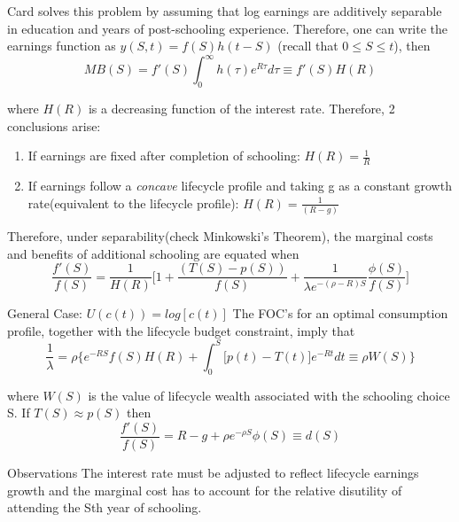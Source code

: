 \documentclass{beamer}
\begin{document}
\begin{frame}{}
Card solves this problem by assuming that log earnings are additively separable in education and years of post-schooling experience. Therefore, one can write the earnings function as $y(S,t)= f(S)h(t-S)$ (recall that $0 \leq S \leq t$), then 
\begin{equation*}
    MB(S)= f'(S) \int_{0}^{\infty} h(\tau) e^{R \tau}d\tau \equiv f'(S) H(R)
\end{equation*}
 
 where $H(R)$ is a decreasing function of the interest rate. Therefore, 2 conclusions arise: 
 \begin{enumerate}
     \item If earnings are fixed after completion of schooling: $H(R)=\frac{1}{R}$
     \item If earnings follow a \textit{concave} lifecycle profile and taking g as a constant growth rate(equivalent to the lifecycle profile): $H(R)=\frac{1}{(R-g)}$
     
 \end{enumerate}
 
 Therefore, under separability(check Minkowski's Theorem), the marginal costs and benefits of additional schooling are equated when
 \begin{equation*}
     \frac{f'(S)}{f(S)}= \frac{1}{H(R)}\Bigg[ 1+ \frac{(T(S)-p(S))}{f(S)} + \frac{1}{\lambda e^{-(\rho - R)S}}\frac{\phi(S)}{f(S)}\Bigg]
 \end{equation*}
\end{frame}

 \begin{frame}{General Case: $U(c(t)) = log[c(t)]$}
     The FOC's for an optimal consumption profile, together with the lifecycle budget constraint, imply that
     \begin{equation*}
         \frac{1}{\lambda}= \rho \Bigg\{ e^{-RS}f(S) H(R) + \int_{0}^{S} \Big[ p(t) -T(t)\Big] e^{-R t} dt \equiv \rho W(S) \Bigg\}
     \end{equation*}
     
where $W(S)$ is the value of lifecycle wealth associated with the schooling choice S. If $T(S) \approx p(S)$ then 
\begin{equation}
    \frac{f'(S)}{f(S)}= R - g +\rho e^{-\rho S}\phi(S) \equiv d(S)
\end{equation}

\begin{block}{Observations}
 The interest rate must be adjusted to reflect lifecycle earnings growth and the marginal cost has to account for the relative disutility of attending the Sth year of schooling.

\end{block}
\end{frame}  
\end{document}
